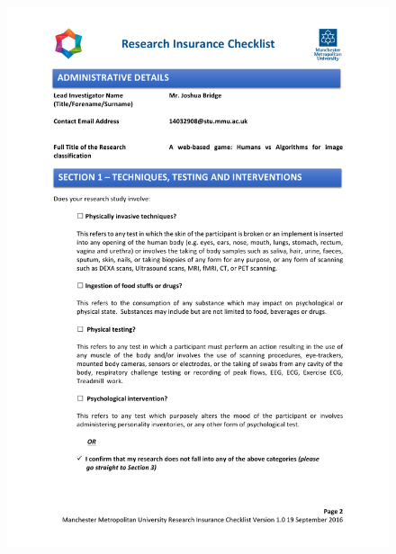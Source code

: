 \documentclass[a4paper,12pt]{report}
\begin{document}
\begin{appendices}
    \begin{figure}[h]
      \centering
      \includegraphics[scale=0.8]{insurance-checklist-2}
    \end{figure}


\end{appendices}
\end{document}
